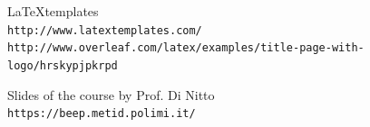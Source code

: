 \documentclass[12pt]{article}
\begin{document}
\clearpage
\begin{thebibliography}{9}

  \LaTeX templates
  \\\texttt{http://www.latextemplates.com/}
  \\\texttt
  {http://www.overleaf.com/latex/examples/title-page-with-logo/hrskypjpkrpd}

  Slides of the course by Prof. Di Nitto
  \\\texttt{https://beep.metid.polimi.it/}





\end{thebibliography}
\end{document}
